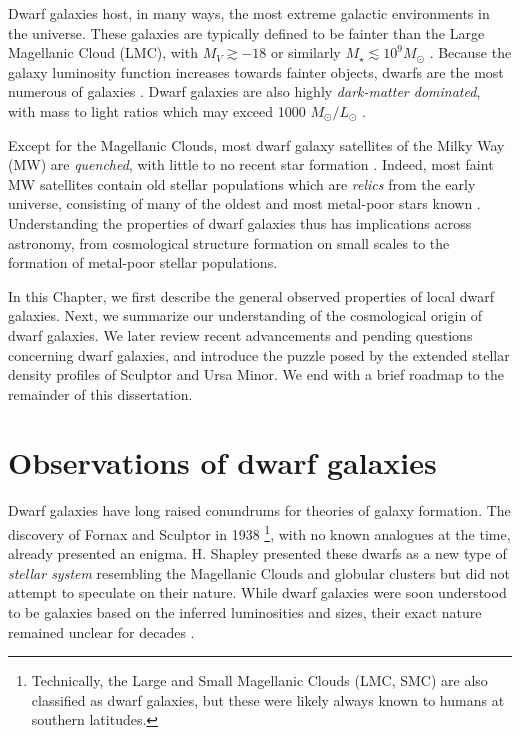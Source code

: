 Dwarf galaxies host, in many ways, the most extreme galactic
environments in the universe. These galaxies are typically defined to be
fainter than the Large Magellanic Cloud (LMC), with \(M_V \gtrsim -18\)
or similarly \(M_\star \lesssim 10^9 M_\odot\)
\citep[e.g.,][]{mcconnachie2012, bullock+boylan-kolchin2017}. Because
the galaxy luminosity function increases towards fainter objects, dwarfs
are the most numerous of galaxies
\citep[e.g.,][]{blanton+2005, mao+2021}. Dwarf galaxies are also highly
\emph{dark-matter dominated}, with mass to light ratios which may exceed
1000 \(M_\odot/ L_\odot\) \citep[implying \(\sim1000\) times more dark
matter than stellar matter, e.g.,][]{simon+geha2007, hayashi+2023}.

Except for the Magellanic Clouds, most dwarf galaxy satellites of the
Milky Way (MW) are \emph{quenched}, with little to no recent star
formation \citep[e.g.,][]{weisz+2014}. Indeed, most faint MW satellites
contain old stellar populations which are \emph{relics} from the early
universe, consisting of many of the oldest and most metal-poor stars
known \citep{simon2019}. Understanding the properties of dwarf galaxies
thus has implications across astronomy, from cosmological structure
formation on small scales to the formation of metal-poor stellar
populations.

In this Chapter, we first describe the general observed properties of
local dwarf galaxies. Next, we summarize our understanding of the
cosmological origin of dwarf galaxies. We later review recent
advancements and pending questions concerning dwarf galaxies, and
introduce the puzzle posed by the extended stellar density profiles of
Sculptor and Ursa Minor. We end with a brief roadmap to the remainder of
this dissertation.

\section{Observations of dwarf
galaxies}\label{observations-of-dwarf-galaxies}

Dwarf galaxies have long raised conundrums for theories of galaxy
formation. The discovery of Fornax and Sculptor in 1938
\citep{shapley1938}\footnote{Technically, the Large and Small Magellanic
  Clouds (LMC, SMC) are also classified as dwarf galaxies, but these
  were likely always known to humans at southern latitudes.}, with no
known analogues at the time, already presented an enigma. H. Shapley
presented these dwarfs as a new type of \emph{stellar system} resembling
the Magellanic Clouds and globular clusters but did not attempt to
speculate on their nature. While dwarf galaxies were soon understood to
be galaxies based on the inferred luminosities and sizes, their exact
nature remained unclear for decades
\citep[e.g.,][]{hodge1971, gallagher+wyse1994}.

